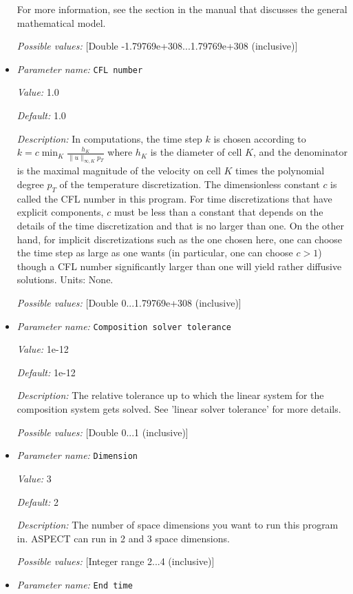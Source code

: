 \begin{itemize}
For more information, see the section in the manual that discusses the general mathematical model.


{\it Possible values:} [Double -1.79769e+308...1.79769e+308 (inclusive)]
\item {\it Parameter name:} {\tt CFL number}


{\it Value:} 1.0


{\it Default:} 1.0


{\it Description:} In computations, the time step $k$ is chosen according to $k = c \min_K \frac {h_K} {\|u\|_{\infty,K} p_T}$ where $h_K$ is the diameter of cell $K$, and the denominator is the maximal magnitude of the velocity on cell $K$ times the polynomial degree $p_T$ of the temperature discretization. The dimensionless constant $c$ is called the CFL number in this program. For time discretizations that have explicit components, $c$ must be less than a constant that depends on the details of the time discretization and that is no larger than one. On the other hand, for implicit discretizations such as the one chosen here, one can choose the time step as large as one wants (in particular, one can choose $c>1$) though a CFL number significantly larger than one will yield rather diffusive solutions. Units: None.


{\it Possible values:} [Double 0...1.79769e+308 (inclusive)]
\item {\it Parameter name:} {\tt Composition solver tolerance}


{\it Value:} 1e-12


{\it Default:} 1e-12


{\it Description:} The relative tolerance up to which the linear system for the composition system gets solved. See 'linear solver tolerance' for more details.


{\it Possible values:} [Double 0...1 (inclusive)]
\item {\it Parameter name:} {\tt Dimension}


{\it Value:} 3


{\it Default:} 2


{\it Description:} The number of space dimensions you want to run this program in. ASPECT can run in 2 and 3 space dimensions.


{\it Possible values:} [Integer range 2...4 (inclusive)]
\item {\it Parameter name:} {\tt End time}



\end{itemize}
